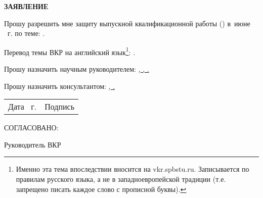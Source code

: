 \vspace{0pt plus1fill} %


{\centering%
	
	\MakeUppercase{\bfseries{}Заявление} \\ 

	
	
\intervalS%
}\par%

\intervalS%

	Прошу разрешить мне защиту выпускной квалификационной работы (\thesisDegree) в~июне \thesisYear~г. по теме: {\expandafter \ulined \thesisTitle.}
	
\intervalS%
	
	Перевод темы ВКР на английский язык\footnote{Именно эта тема впоследствии вносится на vkr.spbstu.ru.
		Записывается по правилам русского языка, а не в западноевропейской традиции (т.е. запрещено писать каждое слово с прописной буквы).}:
	{\expandafter \ulined \thesisTitleEn.}
	
	
	

	
\intervalS%

Прошу назначить научным руководителем: \uline{\SupervisorJobVin, \SupervisorDegree, \SupervisorVin.}

\intervalS%

Прошу назначить консультантом: \uline{\ConsultantExtraDegreeVin{}, \ConsultantExtraVin.}

\intervalS%


\noindent
\begin{minipage}{\linewidth}
	\vspace{\mfloatsep} %
	\begin{tabularx}{\linewidth}{Xl}

		\hspace*{-0.7em} Дата \uline{\thesisStartDate}~г. &Подпись \underline{\hspace*{0.1\textheight}} \\
		\end{tabularx}
	\vspace{\mfloatsep} %
\end{minipage}

\intervalS%

\noindent\MakeUppercase{Согласовано:}

\intervalS%

\noindent Руководитель ВКР \uline{\hspace*{0.1\textheight} \Supervisor}


